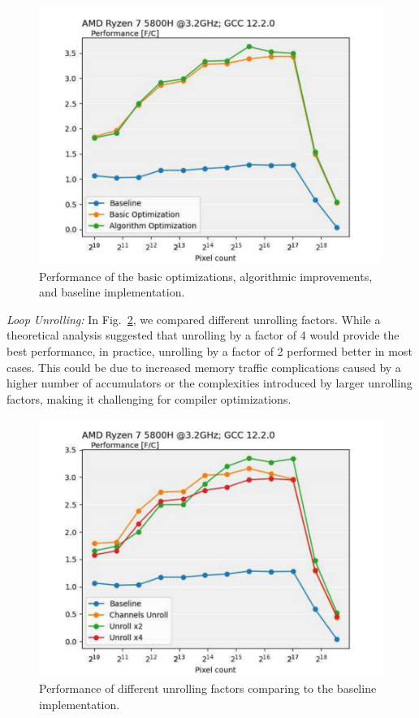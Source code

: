 \documentclass[letterpaper]{article}
\begin{document}
\begin{figure}[htbp]
\centering
  \includegraphics[scale=0.45]{PerfBasic.pdf}
  \caption{Performance of the basic optimizations, algorithmic improvements, and baseline implementation.
  \label{perfBase}}
\end{figure}

\textit{Loop Unrolling:} In Fig.~\ref{perfUnroll}, we compared different unrolling factors. While a theoretical analysis suggested that unrolling by a factor of 4 would provide the best performance, in practice, unrolling by a factor of 2 performed better in most cases. This could be due to increased memory traffic complications caused by a higher number of accumulators or the complexities introduced by larger unrolling factors, making it challenging for compiler optimizations. 

\begin{figure}[htbp]
\centering
  \includegraphics[scale=0.45]{PerfUnroll.pdf}
  \caption{Performance of different unrolling factors comparing to the baseline implementation.
  \label{perfUnroll}}
\end{figure}
\end{document}
